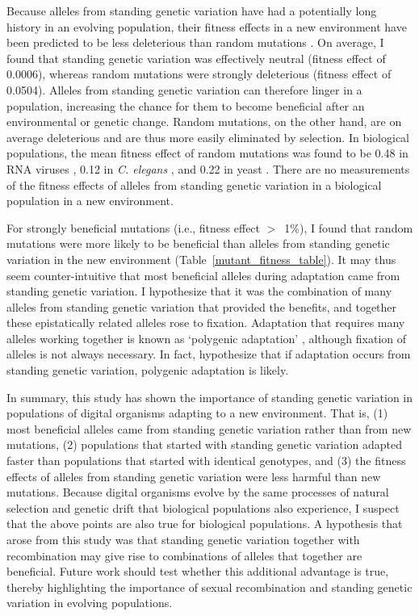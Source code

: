 \begin{doublespace}
Because alleles from standing genetic variation
have had a potentially long history in an evolving population,
their fitness effects in a new environment
have been predicted to be less deleterious
than random mutations \citep{bar08}.
%
On average, I found that
standing genetic variation was effectively neutral
(fitness effect of 0.0006),
whereas random mutations were strongly deleterious
(fitness effect of 0.0504).
%
Alleles from standing genetic variation can therefore linger in a population,
increasing the chance for them to become beneficial
after an environmental or genetic change.
%
Random mutations, on the other hand, are on average deleterious
and are thus more easily eliminated by selection.
%
In biological populations,
the mean fitness effect of random mutations
was found to be 0.48 in RNA viruses \citep{san04},
0.12 in \emph{C. elegans} \citep{vas00},
and 0.22 in yeast \citep{zey01}.
%
There are no measurements of the fitness effects
of alleles from standing genetic variation
in a biological population in a new environment.



For strongly beneficial mutations (i.e., fitness effect $>$~1\%),
I found that random mutations were more likely to be beneficial
than alleles from standing genetic variation
in the new environment (Table~\ref{mutant_fitness_table}).
%
It may thus seem counter-intuitive that
most beneficial alleles during adaptation
came from standing genetic variation.
%
I hypothesize that it was the combination of many alleles
from standing genetic variation that provided the benefits,
and together these epistatically related alleles rose to fixation.
%
Adaptation that requires many alleles working together
is known as `polygenic adaptation' \citep{pri10},
although fixation of alleles is not always necessary.
%
In fact, \citet{pri10} hypothesize that if
adaptation occurs from standing genetic variation,
polygenic adaptation is likely.



In summary,
this study has shown the importance of standing genetic variation
in populations of digital organisms adapting to a new environment.
%
That is,
(1) most beneficial alleles came from standing genetic variation
rather than from new mutations,
(2) populations that started with standing genetic variation
adapted faster than populations that started with identical genotypes,
and (3) the fitness effects of alleles from standing genetic variation
were less harmful than new mutations.
%
Because digital organisms evolve by the same
processes of natural selection and genetic drift
that biological populations also experience,
I suspect that the above points are also true for biological populations.
%
A hypothesis that arose from this study
was that standing genetic variation together with recombination
may give rise to combinations of alleles that together are beneficial.
%
Future work should test whether this additional advantage is true,
thereby highlighting the importance of sexual recombination
and standing genetic variation in evolving populations.



\end{doublespace}
